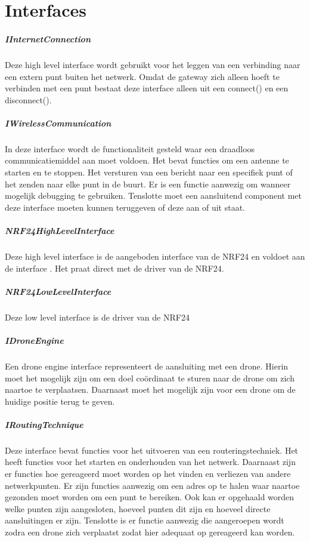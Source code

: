 \documentclass[a4paper, 11pt, oneside]{report}
\begin{document}
\section{Interfaces}
\label{architectural:interfaces}
\subparagraph{IInternetConnection}
\label{architectural:interfaces:IInternetConnection}
Deze high level interface wordt gebruikt voor het leggen van een verbinding naar een extern punt buiten het netwerk. Omdat de gateway zich alleen hoeft te verbinden met een punt bestaat deze interface alleen uit een connect() en een disconnect().
\subparagraph{IWirelessCommunication}
\label{architectural:interfaces:IWirelessCommunication}
In deze interface wordt de functionaliteit gesteld waar een draadloos communicatiemiddel aan moet voldoen. Het bevat functies om een antenne te starten en te stoppen. Het versturen van een bericht naar een specifiek punt of het zenden naar elke punt in de buurt. Er is een functie aanwezig om wanneer mogelijk debugging te gebruiken. Tenslotte moet een aansluitend component met deze interface moeten kunnen teruggeven of deze aan of uit staat.

\subparagraph{NRF24HighLevelInterface}
\label{architectural:interfaces:NRF24HighLevelInterface}

Deze high level interface is de aangeboden interface van de NRF24 en voldoet aan de interface . Het praat direct met de driver van de NRF24.  

\subparagraph{NRF24LowLevelInterface}
\label{architectural:interfaces:NRF24LowLevelInterface}
Deze low level interface is de driver van de NRF24


\subparagraph{IDroneEngine}
\label{architectural:interfaces:IDroneEngine}
Een drone engine interface representeert de aansluiting met een drone.
Hierin moet het mogelijk zijn om een doel coördinaat te sturen naar de drone om zich naartoe te verplaatsen. 
Daarnaast moet het mogelijk zijn voor een drone om de huidige positie terug te geven.
\subparagraph{IRoutingTechnique}
\label{architectural:interfaces:IRoutingTechnique}
Deze interface bevat functies voor het uitvoeren van een routeringstechniek.
Het heeft functies voor het starten en onderhouden van het netwerk.
Daarnaast zijn er functies hoe gereageerd moet worden op het vinden en verliezen van andere netwerkpunten.
Er zijn functies aanwezig om een adres op te halen waar naartoe gezonden moet worden om een punt te bereiken.
Ook kan er opgehaald worden welke punten zijn aangesloten, hoeveel punten dit zijn en hoeveel directe aansluitingen er zijn.
Tenslotte is er functie aanwezig die aangeroepen wordt zodra een drone zich verplaatst zodat hier adequaat op gereageerd kan worden.
\end{document}
